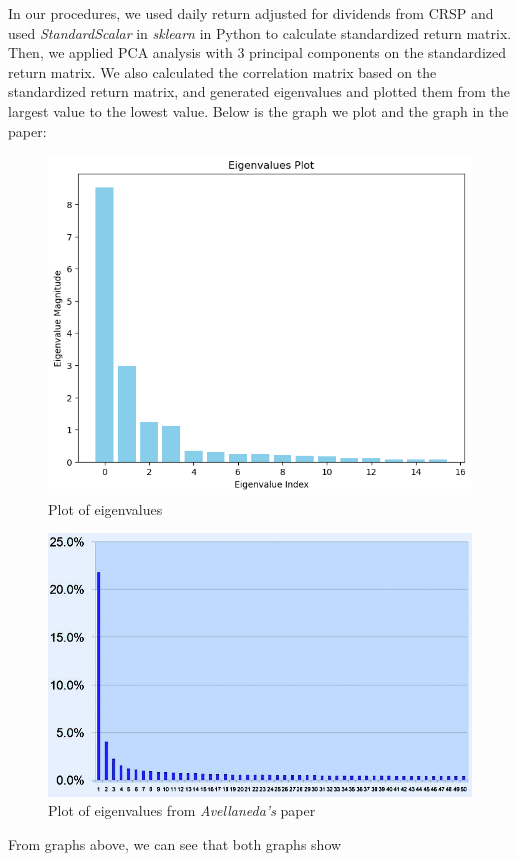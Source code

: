 \documentclass[12pt, letterpaper, twoside]{article}
\begin{document}
    In our procedures, we used daily return adjusted for 
    dividends from CRSP and used \textit{StandardScalar} in 
    \textit{sklearn} in Python to calculate standardized 
    return matrix. Then, we applied PCA analysis 
    with 3 principal components on the standardized 
    return matrix. We also calculated the correlation 
    matrix based on the standardized return matrix, 
    and generated eigenvalues and plotted them 
    from the largest value to the lowest value. 
    Below is the graph we plot and the graph in the paper:\\
    \begin{figure}[h]
        \centering
        \includegraphics[width=0.8\linewidth]{eigenvalues.png}
        \caption{Plot of eigenvalues}
    \end{figure}
    \begin{figure}[h]
        \centering
        \includegraphics[width=0.8\linewidth]{paper1.jpg}
        \caption{Plot of eigenvalues from \textit{Avellaneda's} paper}
    \end{figure}
    From graphs above, we can see that both graphs show 
\end{document}
